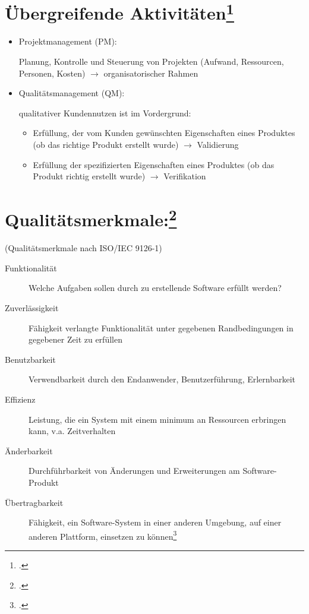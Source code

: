 \documentclass{bschlangaul-theorie}
\begin{document}
\section{Übergreifende Aktivitäten\footcite[Seite 11]{sosy:fs:1}}

\begin{itemize}
\item Projektmanagement (PM):

Planung, Kontrolle und Steuerung von Projekten (Aufwand, Ressourcen,
Personen, Kosten) $\rightarrow$ organisatorischer Rahmen

\item Qualitätsmanagement (QM):

qualitativer Kundennutzen ist im Vordergrund:

\begin{itemize}
\item Erfüllung, der vom Kunden gewünschten Eigenschaften eines Produktes
(ob das richtige Produkt erstellt wurde) $\rightarrow$ Validierung

\item Erfüllung der spezifizierten Eigenschaften eines Produktes
(ob das Produkt richtig erstellt wurde) $\rightarrow$ Verifikation
\end{itemize}

\end{itemize}

\section{Qualitätsmerkmale:\footcite[Seite 12]{sosy:fs:1}}

(Qualitätsmerkmale nach ISO/IEC 9126-1)

\begin{description}

\item[Funktionalität]
Welche Aufgaben sollen durch zu erstellende Software erfüllt werden?

\item[Zuverlässigkeit]
Fähigkeit verlangte Funktionalität unter gegebenen Randbedingungen in
gegebener Zeit zu erfüllen

\item[Benutzbarkeit]
Verwendbarkeit durch den Endanwender, \zB Benutzerführung,
Erlernbarkeit

\item[Effizienz]
Leistung, die ein System mit einem minimum an Ressourcen erbringen kann,
v.a. Zeitverhalten

\item[Änderbarkeit]
Durchführbarkeit von Änderungen und Erweiterungen am Software-Produkt

\item[Übertragbarkeit]
Fähigkeit, ein Software-System in einer anderen Umgebung, \zB auf
einer anderen Plattform, einsetzen zu können\footcite[Seite
15-16]{schatten}
\end{description}
\end{document}
